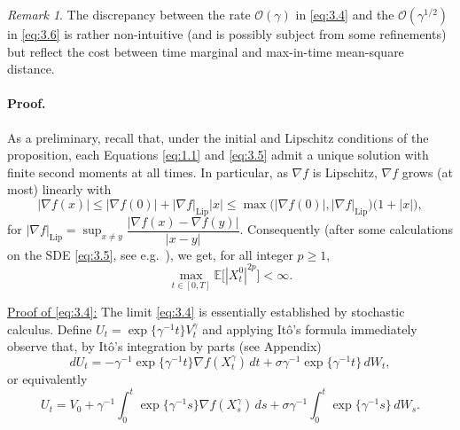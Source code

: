 \documentclass[11pt]{article}
\theoremstyle{remark}
\newtheorem{remark}{Remark}[section]
\begin{document}
\begin{remark}
The discrepancy between the rate $\mathcal{O}(\gamma)$ in \eqref{eq:3.4} and the $\mathcal{O}(\gamma^{1/2})$ in \eqref{eq:3.6} is rather non-intuitive (and is possibly subject from some refinements) but reflect the cost between time marginal and max-in-time mean-square distance.
\end{remark}

\paragraph{Proof.}
As a preliminary, recall that, under the initial and Lipschitz conditions of the proposition, each Equations \eqref{eq:1.1} and \eqref{eq:3.5} admit a unique solution with finite second moments at all times.
In particular, as $\nabla f$ is Lipschitz, $\nabla f$ grows (at most) linearly with
\begin{equation}
\label{eq:3.7}
|\nabla f(x)| \le |\nabla f(0)| + |\nabla f|_{\mathrm{Lip}}|x|
\le \max\bigl(|\nabla f(0)|,|\nabla f|_{\mathrm{Lip}}\bigr)\bigl(1+|x|\bigr),
\end{equation}
for $|\nabla f|_{\mathrm{Lip}}=\sup_{x\neq y}\dfrac{|\nabla f(x)-\nabla f(y)|}{|x-y|}$.
Consequently (after some calculations on the SDE \eqref{eq:3.5}, see e.g.~\cite{ks91}), we get, for all integer $p\ge1$,
\begin{equation}
\label{eq:3.8}
\max_{t\in[0,T]}\mathbb{E}\bigl[|X_t^0|^{2p}\bigr]<\infty.
\end{equation}


\underline{Proof of \eqref{eq:3.4}:}
The limit \eqref{eq:3.4} is essentially established by stochastic calculus. Define $U_t=\exp\{\gamma^{-1}t\}V_t^{\gamma}$
and applying It\^o's formula immediately observe that, by It\^o's integration by parts (see Appendix)
\[
dU_t=-\gamma^{-1}\exp\{\gamma^{-1}t\}\nabla f(X_t^{\gamma})\,dt+\sigma\gamma^{-1}\exp\{\gamma^{-1}t\}\,dW_t,
\]
or equivalently
\[
U_t=V_0+\gamma^{-1}\int_0^t \exp\{\gamma^{-1}s\}\nabla f(X_s^{\gamma})\,ds+\sigma\gamma^{-1}\int_0^t \exp\{\gamma^{-1}s\}\,dW_s.
\]
\end{document}

